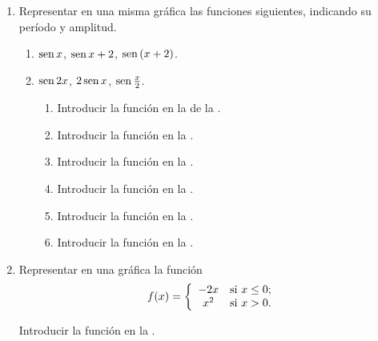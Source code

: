 \begin{enumerate}[leftmargin=*]
\item Representar en una misma gráfica las funciones siguientes, indicando su período y amplitud.
      \begin{enumerate}
      \item $\operatorname{sen}{x}$, $\operatorname{sen}{x}+2$, $\operatorname{sen}{(x+2)}$.
      \item $\operatorname{sen}{2x}$, $2\operatorname{sen}{x}$, $\operatorname{sen}\frac{x}{2}$.
            \begin{indication}
            \begin{enumerate}
            \item Introducir la función  en la  de la .
            \item Introducir la función  en la .
            \item Introducir la función  en la .
            \item Introducir la función  en la .
            \item Introducir la función  en la .
            \item Introducir la función  en la .
            \end{enumerate}
            \end{indication}
      \end{enumerate}


\item Representar en una gráfica la función
      \[
      \ f(x)=\left\{
      \begin{array}{cl}
      -2x   & \hbox{si $x\leq0$;} \\
      x^{2} & \hbox{si $x>0$.}    \\
      \end{array}
      \right.
      \]

      \begin{indication}
      Introducir la función  en la .
      \end{indication}
\end{enumerate}



